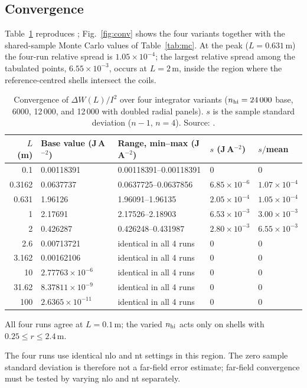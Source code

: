 \documentclass[12pt,a4paper]{article}
\newcommand{\e}[1]{\times10^{#1}}
\newcommand{\filec}[1]{\texttt{\detokenize{#1}}}
\begin{document}
\subsection{Convergence}
Table~\ref{tab:conv} reproduces ; Fig.~\ref{fig:conv} shows the four variants
together with the shared-sample Monte Carlo values of Table~\ref{tab:mc}. At the peak ($L=0.631$\,m) the
four-run relative spread is $1.05\times10^{-4}$; the largest relative spread among the tabulated points,
$6.55\times10^{-3}$, occurs at $L=2$\,m, inside the region where the reference-centred shells intersect the coils.

\begin{table}[t]
\centering
\begin{threeparttable}
\caption{Convergence of $\Delta W(L)/I^2$ over four integrator variants ($n_{\rm hi}=24\,000$ base, 6000,
12\,000, and 12\,000 with doubled radial panels). $s$ is the sample standard deviation ($n-1$, $n=4$).
Source: \filec{csv/convergence_dW.csv}.}
\label{tab:conv}
\small
\begin{tabular}{rllll}
\toprule
$L$ (m) & Base value (J\,A$^{-2}$) & Range, min--max (J\,A$^{-2}$) & $s$ (J\,A$^{-2}$) & $s/$mean\\
\midrule
0.1    & 0.00118391 & 0.00118391--0.00118391 & 0\tnote{a} & 0\\
0.3162 & 0.0637737 & 0.0637725--0.0637856 & $6.85\e{-6}$ & $1.07\e{-4}$\\
0.631  & 1.96126 & 1.96091--1.96135 & $2.05\e{-4}$ & $1.05\e{-4}$\\
1      & 2.17691 & 2.17526--2.18903 & $6.53\e{-3}$ & $3.00\e{-3}$\\
2      & 0.426287 & 0.426248--0.431987 & $2.80\e{-3}$ & $6.55\e{-3}$\\
2.6    & 0.00713721 & identical in all 4 runs & 0\tnote{b} & 0\tnote{b}\\
3.162  & 0.00162106 & identical in all 4 runs & 0\tnote{b} & 0\tnote{b}\\
10     & $2.77763\e{-6}$ & identical in all 4 runs & 0\tnote{b} & 0\tnote{b}\\
31.62  & $8.37811\e{-9}$ & identical in all 4 runs & 0\tnote{b} & 0\tnote{b}\\
100    & $2.6365\e{-11}$ & identical in all 4 runs & 0\tnote{b} & 0\tnote{b}\\
\bottomrule
\end{tabular}
\begin{tablenotes}\footnotesize
\item[a] All four runs agree at $L=0.1$\,m; the varied $n_{\rm hi}$ acts only on shells with $0.25\le r\le2.4$\,m.
\item[b] The four runs use identical nlo and nt settings in this region. The zero sample standard deviation is
therefore not a far-field error estimate; far-field convergence must be tested by varying nlo and nt separately.
\end{tablenotes}
\end{threeparttable}
\end{table}
\end{document}
